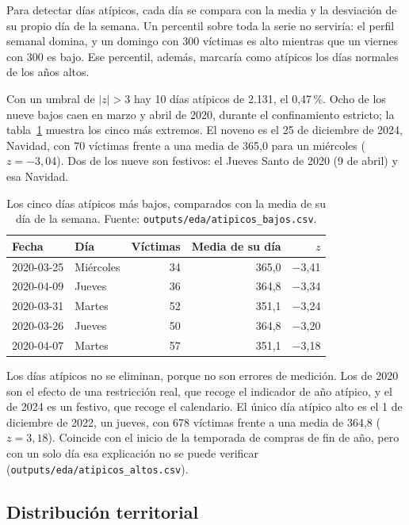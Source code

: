 Para detectar días atípicos, cada día se compara con la media y la desviación de su propio día de la semana. Un percentil sobre toda la serie no serviría: el perfil semanal domina, y un domingo con 300 víctimas es alto mientras que un viernes con 300 es bajo. Ese percentil, además, marcaría como atípicos los días normales de los años altos.

Con un umbral de $|z| > 3$ hay 10 días atípicos de 2.131, el 0,47\,\%. Ocho de los nueve bajos caen en marzo y abril de 2020, durante el confinamiento estricto; la tabla~\ref{tab:eda-atipicos} muestra los cinco más extremos. El noveno es el 25 de diciembre de 2024, Navidad, con 70 víctimas frente a una media de 365,0 para un miércoles ($z = -3{,}04$). Dos de los nueve son festivos: el Jueves Santo de 2020 (9 de abril) y esa Navidad.

\begin{table}[H]
\centering
\caption{Los cinco días atípicos más bajos, comparados con la media de su día de la semana. Fuente: \texttt{outputs/\allowbreak{}eda/\allowbreak{}atipicos\_\allowbreak{}bajos.csv}.}\label{tab:eda-atipicos}
\small
\begin{tabular}{@{}llrrr@{}}
\toprule
\textbf{Fecha} & \textbf{Día} & \textbf{Víctimas} & \textbf{Media de su día} & \textbf{$z$} \\
\midrule
2020-03-25 & Miércoles & 34 & 365,0 & $-$3,41 \\
2020-04-09 & Jueves & 36 & 364,8 & $-$3,34 \\
2020-03-31 & Martes & 52 & 351,1 & $-$3,24 \\
2020-03-26 & Jueves & 50 & 364,8 & $-$3,20 \\
2020-04-07 & Martes & 57 & 351,1 & $-$3,18 \\
\bottomrule
\end{tabular}
\end{table}

Los días atípicos no se eliminan, porque no son errores de medición. Los de 2020 son el efecto de una restricción real, que recoge el indicador de año atípico, y el de 2024 es un festivo, que recoge el calendario. El único día atípico alto es el 1 de diciembre de 2022, un jueves, con 678 víctimas frente a una media de 364,8 ($z = 3{,}18$). Coincide con el inicio de la temporada de compras de fin de año, pero con un solo día esa explicación no se puede verificar (\texttt{outputs/\allowbreak{}eda/\allowbreak{}atipicos\_\allowbreak{}altos.csv}).

\subsection{Distribución territorial}\label{sec:territorial}


